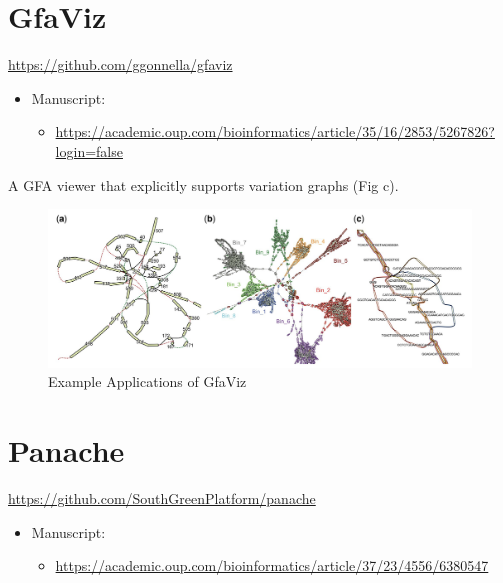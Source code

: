\documentclass[
]{book}
\providecommand{\tightlist}{%
  \setlength{\itemsep}{0pt}\setlength{\parskip}{0pt}}
\begin{document}
\hypertarget{gfaviz}{%
\section{GfaViz}\label{gfaviz}}

\url{https://github.com/ggonnella/gfaviz}

\begin{itemize}
\tightlist
\item
  Manuscript:

  \begin{itemize}
  \tightlist
  \item
    \url{https://academic.oup.com/bioinformatics/article/35/16/2853/5267826?login=false}
  \end{itemize}
\end{itemize}

A GFA viewer that explicitly supports variation graphs (Fig c).

\begin{figure}
\centering
\includegraphics[width=1\textwidth,height=\textheight]{./Figures/Fig2.png}
\caption{Example Applications of GfaViz}
\end{figure}

\hypertarget{panache}{%
\section{Panache}\label{panache}}

\url{https://github.com/SouthGreenPlatform/panache}

\begin{itemize}
\tightlist
\item
  Manuscript:

  \begin{itemize}
  \tightlist
  \item
    \url{https://academic.oup.com/bioinformatics/article/37/23/4556/6380547}
  \end{itemize}
\end{itemize}
\end{document}
